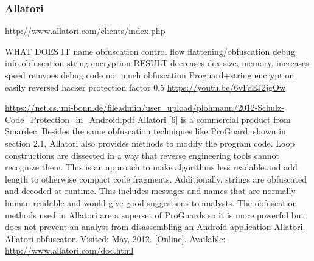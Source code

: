 \subsubsection{Allatori}\label{subsubsection:counter-reengineering-optobf-allatori}
\url{http://www.allatori.com/clients/index.php}\newline

WHAT DOES IT\newline
name obfuscation\newline
control flow flattening/obfuscation\newline
debug info obfuscation\newline
string encryption\newline
RESULT\newline
decreases dex size, memory, increases speed\newline
remvoes debug code\newline
not much obfuscation\newline
Proguard+string encryption\newline
easily reversed\newline
hacker protection factor 0.5\newline
\url{https://youtu.be/6vFcEJ2jgOw}


\url{https://net.cs.uni-bonn.de/fileadmin/user_upload/plohmann/2012-Schulz-Code_Protection_in_Android.pdf}\newline
Allatori [6] is a commercial product from Smardec. Besides the same obfuscation techniques
like ProGuard, shown in section 2.1, Allatori also provides methods to modify the
program code. Loop constructions are dissected in a way that reverse engineering tools
cannot recognize them. This is an approach to make algorithms less readable and add
length to otherwise compact code fragments. Additionally, strings are obfuscated and decoded
at runtime. This includes messages and names that are normally human readable
and would give good suggestions to analysts.
The obfuscation methods used in Allatori are a superset of ProGuards so it is more
powerful but does not prevent an analyst from disassembling an Android application\newline
Allatori. Allatori obfuscator. Visited: May, 2012. [Online]. Available: \url{http://www.allatori.com/doc.html}
